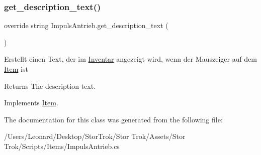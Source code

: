 \subsubsection{\texorpdfstring{get\+\_\+description\+\_\+text()}{get\_description\_text()}}
{\footnotesize\ttfamily override string Impuls\+Antrieb.\+get\+\_\+description\+\_\+text (\begin{DoxyParamCaption}{ }\end{DoxyParamCaption})\hspace{0.3cm}{\ttfamily [virtual]}}



Erstellt einen Text, der im \hyperlink{class_inventar}{Inventar} angezeigt wird, wenn der Mauszeiger auf dem \hyperlink{class_item}{Item} ist 

\begin{DoxyReturn}{Returns}
The description text.
\end{DoxyReturn}


Implements \hyperlink{class_item_ab868f8ccad92378f7352e3a9e0f755ff}{Item}.



The documentation for this class was generated from the following file\+:\begin{DoxyCompactItemize}
\item 
/\+Users/\+Leonard/\+Desktop/\+Stor\+Trok/\+Stor Trok/\+Assets/\+Stor Trok/\+Scripts/\+Items/Impuls\+Antrieb.\+cs\end{DoxyCompactItemize}
